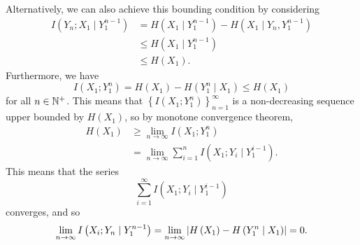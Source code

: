 \documentclass[math, code]{amznotes}
\theoremstyle{remark}
\begin{document}
Alternatively, we can also achieve this bounding condition by considering 
\begin{align*}
    I\left(Y_n ; X_1 \mid Y_1^{n - 1}\right) & = H\left(X_1 \mid Y_1^{n - 1}\right) - H\left(X_1 \mid Y_n, Y_1^{n - 1}\right) \\
    & \leq H\left(X_1 \mid Y_1^{n - 1}\right) \\
    & \leq H\left(X_1\right).
\end{align*}
Furthermore, we have 
\begin{equation*}
    I\left(X_1 ; Y_1^n\right) = H\left(X_1\right) - H\left(Y_1^n \mid X_1\right) \leq H\left(X_1\right)
\end{equation*}
for all $n \in \mathbb{N}^+$. This means that $\left\{I\left(X_1 ; Y_1^n\right)\right\}_{n = 1}^{\infty}$ is a non-decreasing sequence upper bounded by $H\left(X_1\right)$, so by monotone convergence theorem,
\begin{align*}
    H\left(X_1\right) & \geq \lim_{n \to \infty}I\left(X_1 ; Y_1^n\right) \\
    & = \lim_{n \to \infty}\sum_{i = 1}^{n}I\left(X_1 ; Y_i \mid Y_1^{i - 1}\right).
\end{align*}
This means that the series 
\begin{equation*}
    \sum_{i = 1}^{\infty}I\left(X_1 ; Y_i \mid Y_1^{i - 1}\right)
\end{equation*}
converges, and so 
\begin{equation*}
    \lim_{n \to \infty}I\left(X_i ; Y_n \mid Y_1^{n - 1}\right) = \lim_{n \to \infty}{\left\lvert {H\left(X_1\right) - H\left(Y_1^n \mid X_1\right)} \right\rvert} = 0.
\end{equation*}
\end{document}
